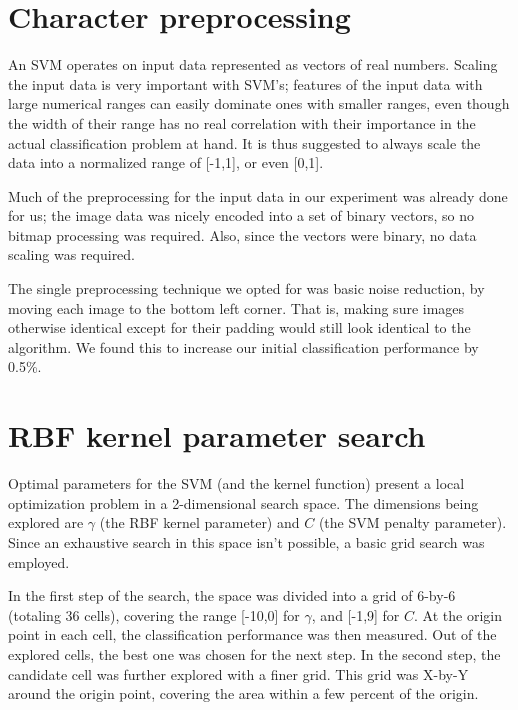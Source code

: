 \documentclass{netsec2012}
\begin{document}
\section{Character preprocessing}

An SVM operates on input data represented as vectors of real numbers.  Scaling the input data is
very important with SVM's; features of the input data with large numerical ranges can easily
dominate ones with smaller ranges, even though the width of their range has no real correlation with
their importance in the actual classification problem at hand.  It is thus suggested to always scale
the data into a normalized range of [-1,1], or even [0,1].

Much of the preprocessing for the input data in our experiment was already done for us; the image
data was nicely encoded into a set of binary vectors, so no bitmap processing was required.  Also,
since the vectors were binary, no data scaling was required.

The single preprocessing technique we opted for was basic noise reduction, by moving each image to
the bottom left corner.  That is, making sure images otherwise identical except for their padding
would still look identical to the algorithm.  We found this to increase our initial classification
performance by 0.5\%.


\section{RBF kernel parameter search}

\label{ref:kernelparamsearch}

Optimal parameters for the SVM (and the kernel function) present a local optimization problem in a
2-dimensional search space.  The dimensions being explored are $\gamma$ (the RBF kernel parameter)
and $C$ (the SVM penalty parameter).  Since an exhaustive search in this space isn't possible, a
basic grid search was employed.

In the first step of the search, the space was divided into a grid of 6-by-6 (totaling 36 cells),
covering the range [-10,0] for $\gamma$, and [-1,9] for $C$.  At the origin point in each cell, the
classification performance was then measured.  Out of the explored cells, the best one was chosen
for the next step.  In the second step, the candidate cell was further explored with a finer grid.
This grid was X-by-Y around the origin point, covering the area within a few percent of the origin.
\end{document}
